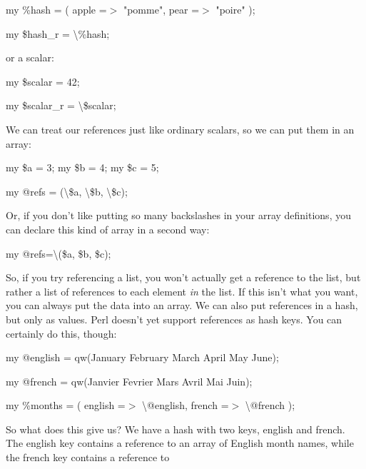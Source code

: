 \documentclass[a4paper,11pt]{book}
\begin{document}
\noindent 

\noindent 

\noindent my \%hash = ( apple =$>$ "pomme", pear =$>$ "poire" );

\noindent my \$hash\_r = \textbackslash \%hash;

\noindent 

\noindent or a scalar:

\noindent 

\noindent 

\noindent my \$scalar = 42;

\noindent my \$scalar\_r = \textbackslash \$scalar;

\noindent 

\noindent We can treat our references just like ordinary scalars, so we can put them in an array:

\noindent 

\noindent 

\noindent my \$a = 3; my \$b = 4; my \$c = 5;

\noindent my @refs = (\textbackslash \$a, \textbackslash \$b, \textbackslash \$c);

\noindent 

\noindent Or, if you don't like putting so many backslashes in your array definitions, you can declare this kind of array in a second way:

\noindent 

\noindent 

\noindent my @refs=\textbackslash (\$a, \$b, \$c);

\noindent 

\noindent So, if you try referencing a list, you won't actually get a reference to the list, but rather a list of references to each element \textit{in }the list. If this isn't what you want, you can always put the data into an array. We can also put references in a hash, but only as values. Perl doesn't yet support references as hash keys. You can certainly do this, though:

\noindent 

\noindent my @english = qw(January February March April May June);

\noindent my @french  = qw(Janvier Fevrier  Mars  Avril Mai Juin);

\noindent my \%months  = ( english =$>$ \textbackslash @english, french =$>$ \textbackslash @french );

\noindent 

\noindent So what does this give us? We have a hash with two keys, english and french. The english key contains a reference to an array of English month names, while the french key contains a reference to
\end{document}
